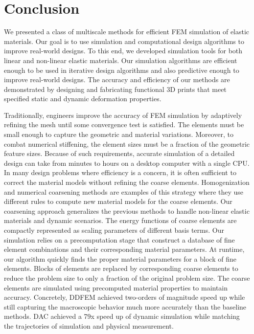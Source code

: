 \chapter{Conclusion}
We presented a class of multiscale methods for efficient FEM simulation of elastic materials.
Our goal is to use simulation and computational design algorithms to improve real-world designs.
To this end, we developed simulation tools for both linear and non-linear elastic materials.
Our simulation algorithms are efficient enough to be used in iterative design algorithms and also predictive enough to improve real-world designs.
The accuracy and efficiency of our methods are demonstrated by designing and fabricating functional 3D prints that meet specified static and dynamic deformation properties.

Traditionally, engineers improve the accuracy of FEM simulation by adaptively refining the mesh until some convergence test is satisfied.
The elements must be small enough to capture the geometric and material variations.
Moreover, to combat numerical stiffening, the element sizes must be a fraction of the geometric feature sizes.
Because of such requirements, accurate simulation of a detailed design can take from minutes to hours on a desktop computer with a single CPU.
In many design problems where efficiency is a concern, it is often sufficient to correct the material models without refining the coarse elements.
Homogenization and numerical coarsening methods are examples of this strategy where they use different rules to compute new material models for the coarse elements.
Our coarsening approach generalizes the previous methods to handle non-linear elastic materials and dynamic scenarios.
The energy functions of coarse elements are compactly represented as scaling parameters of different basis terms.
Our simulation relies on a precomputation stage that construct a database of fine element combinations and their corresponding material parameters.
At runtime, our algorithm quickly finds the proper material parameters for a block of fine elements.
Blocks of elements are replaced by corresponding coarse elements to reduce the problem size to only a fraction of the original problem size.
The coarse elements are simulated using precomputed material properties to maintain accuracy.
Concretely, DDFEM achieved two-orders of magnitude speed up while still capturing the macroscopic behavior much more accurately than the baseline methods.
DAC achieved a 79x speed up of dynamic simulation while matching the trajectories of simulation and physical measurement.

